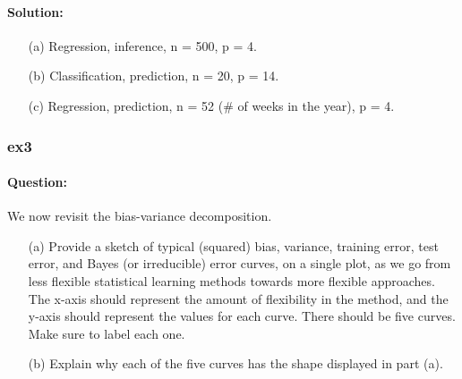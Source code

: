 \documentclass[a4paper,12pt,titlepage]{article} %
\begin{document}
\paragraph{Solution:}
\begin{itemize}
	\item[(a)] Regression, inference, n = 500, p = 4.
	\item[(b)] Classification, prediction, n = 20, p = 14.
	\item[(c)] Regression, prediction, n = 52 (\# of weeks in the year), p = 4.
\end{itemize}


\subsubsection{ex3}
\paragraph{Question:} We now revisit the bias-variance decomposition.

\begin{itemize}
	\item[(a)] Provide a sketch of typical (squared) bias, variance, training error, test error, and Bayes (or irreducible) error curves, on a single plot, as we go from less flexible statistical learning methods towards more flexible approaches. The x-axis should represent the amount of flexibility in the method, and the y-axis should represent the values for each curve. There should be five curves.	Make sure to label each one.
	
	\item[(b)] Explain why each of the five curves has the shape displayed in part (a).	
\end{itemize}
\end{document}
